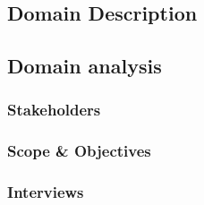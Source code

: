 \subsection{Domain Description} %
\label{sub:problem_description}
\subsection{Domain analysis} %
\subsubsection{Stakeholders} %
\subsubsection{Scope \& Objectives}
\subsubsection{Interviews} %

